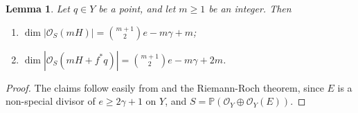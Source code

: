 \documentclass[a4paper,12pt]{amsart}
\newtheorem{lemma}[thm]{Lemma}
\def\dim{\operatorname{dim}}
\begin{document}
\begin{lemma}\label{Sec2_dim_LinSer_on_S}
Let $q \in Y$ be a point, and let $m \geq 1$ be an integer. Then
\begin{enumerate}[label=(\roman*), leftmargin=*, font=\rmfamily]
 \item $\dim |\mathcal{O}_S (mH)| = \binom{m+1}{2}e - m\gamma + m$;

 \item $\dim |\mathcal{O}_S (mH + f^{\ast} q)| = \binom{m+1}{2}e - m\gamma + 2m$.
\end{enumerate}
\end{lemma}
\begin{proof}
The claims follow easily from \cite[Lemma 35]{GP2005} and the Riemann-Roch theorem, since $E$ is a non-special divisor of $e \geq 2\gamma + 1$ on $Y$, and $S = \mathbb{P} (\mathcal{O}_Y \oplus \mathcal{O}_Y (E))$.
\end{proof}
\end{document}
